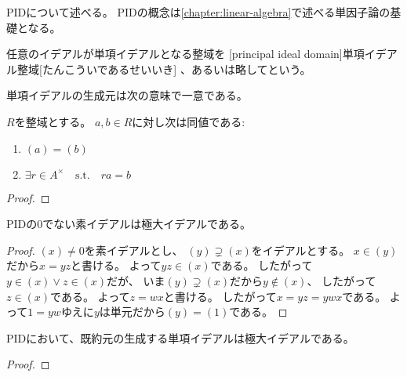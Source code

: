 \documentclass[report]{jlreq}
\begin{document}
PIDについて述べる。
PIDの概念は\cref{chapter:linear-algebra}で述べる単因子論の基礎となる。

\begin{definition}[PID]
    任意のイデアルが単項イデアルとなる整域を
    [principal ideal domain]{単項イデアル整域}[たんこういであるせいいき]
    、あるいは略してという。
\end{definition}

単項イデアルの生成元は次の意味で一意である。

\begin{theorem}[単項イデアルの生成元の一意性]
    $R$を整域とする。
    $a, b \in R$に対し次は同値である:
    \begin{enumerate}
        \item $(a) = (b)$
        \item $\exists r \in A^\times \quad \text{s.t.} \quad ra = b$
    \end{enumerate}
\end{theorem}

\begin{proof}
    \TODO{}
\end{proof}

\begin{theorem}
    PIDの$0$でない素イデアルは極大イデアルである。
\end{theorem}

\begin{proof}
    $(x) \neq 0$を素イデアルとし、
    $(y) \supsetneq (x)$をイデアルとする。
    $x \in (y)$だから$x = yz$と書ける。
    よって$yz \in (x)$である。
    したがって$y \in (x) \lor z \in (x)$だが、
    いま$(y) \supsetneq (x)$だから$y \notin (x)$、
    したがって$z \in (x)$である。
    よって$z = wx$と書ける。
    したがって$x = yz = ywx$である。
    よって$1 = yw$ゆえに$y$は単元だから$(y) = (1)$である。
\end{proof}

\begin{proposition}
    PIDにおいて、既約元の生成する単項イデアルは極大イデアルである。
\end{proposition}

\begin{proof}
    \TODO{}
\end{proof}

\end{document}
